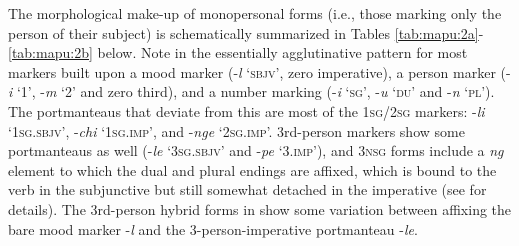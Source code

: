 \documentclass[output=paper,colorlinks,citecolor=brown,draft]{langscibook}
\begin{document}
The morphological make-up of monopersonal forms (i.e., those marking only the person of their subject) is schematically summarized in Tables \ref{tab:mapu:2a}-\ref{tab:mapu:2b} below. Note in  the essentially agglutinative pattern for most markers built upon a mood marker (\nobreakdash-\textit{l} ‘\textsc{sbjv}’, zero imperative), a person marker (-\textit{i} ‘1’, -\textit{m} ‘2’ and zero third), and a number marking (-\textit{i} ‘\textsc{sg’}, -\textit{u} ‘\textsc{du}’ and \nobreakdash-\textit{n} ‘\textsc{pl’}). The portmanteaus that deviate from this are most of the \textsc{1sg/2sg} markers: \nobreakdash-\textit{li} ‘\textsc{1sg.sbjv’}, \nobreakdash-\textit{chi} ‘\textsc{1sg.imp}’, and \nobreakdash-\textit{nge} ‘\textsc{2sg.imp’.} 3rd-person markers show some portmanteaus as well (\nobreakdash-\textit{le} ‘\textsc{3sg.sbjv}’ and \nobreakdash-\textit{pe} ‘3.\textsc{imp’}), and \textsc{3nsg} forms include a \textit{ng} element to which the dual and plural endings are affixed, which is bound to the verb in the subjunctive but still somewhat detached in the imperative (see \citealt{Zúñiga2014} for details). The 3rd-person hybrid forms in  show some variation between affixing the bare mood marker \nobreakdash-\textit{l} and the 3-person-imperative portmanteau \nobreakdash-\textit{le}.
\end{document}

